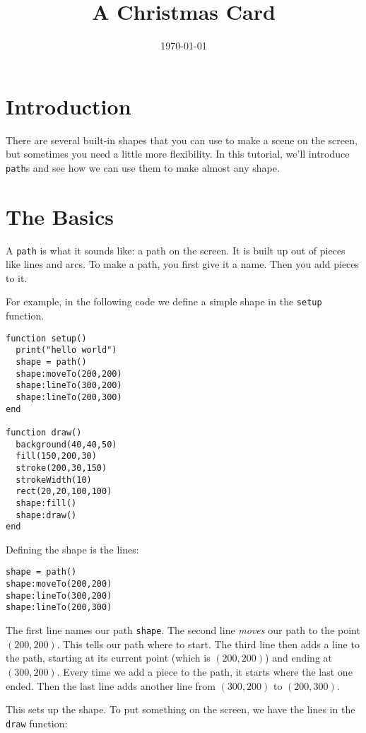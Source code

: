 \documentclass[
  xhtml,%
  use filename%
]{internet}
\title{A Christmas Card}
\date{\today}
\begin{document}
\maketitle

\section{Introduction}

There are several built-in shapes that you can use to make a scene on the screen, but sometimes you need a little more flexibility.
In this tutorial, we'll introduce \verb+path+s and see how we can use them to make almost any shape.

\section{The Basics}

A \verb+path+ is what it sounds like: a path on the screen.
It is built up out of pieces like lines and arcs.
To make a path, you first give it a name.
Then you add pieces to it.

For example, in the following code we define a simple shape in the \verb+setup+ function.

\begin{verbatim}
function setup()
  print("hello world")
  shape = path()
  shape:moveTo(200,200)
  shape:lineTo(300,200)
  shape:lineTo(200,300)
end

function draw()
  background(40,40,50)
  fill(150,200,30)
  stroke(200,30,150)
  strokeWidth(10)
  rect(20,20,100,100)
  shape:fill()
  shape:draw()
end
\end{verbatim}

Defining the shape is the lines:

\begin{verbatim}
shape = path()
shape:moveTo(200,200)
shape:lineTo(300,200)
shape:lineTo(200,300)
\end{verbatim}

The first line names our path \verb+shape+.
The second line \emph{moves} our path to the point \((200,200)\).
This tells our path where to start.
The third line then adds a line to the path, starting at its current point (which is \((200,200)\)) and ending at \((300,200)\).
Every time we add a piece to the path, it starts where the last one ended.
Then the last line adds another line from \((300,200)\) to \((200,300)\).

This sets up the shape.
To put something on the screen, we have the lines in the \verb+draw+ function:
\end{document}
